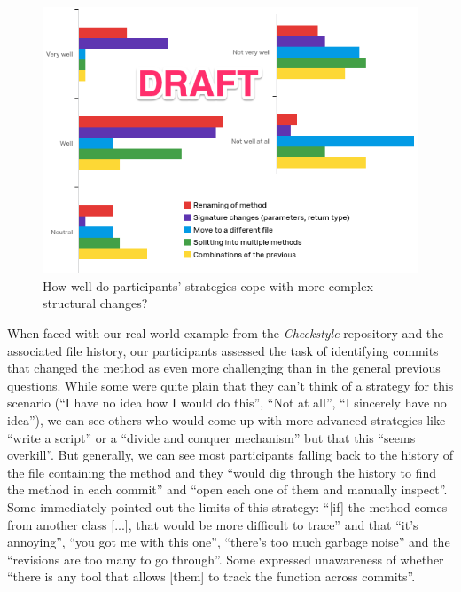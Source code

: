 \begin{figure}[t!]
  \includegraphics[width=0.98\columnwidth]{figures/strategy_complex_changes}
  \caption{How well do participants' strategies cope with more complex structural changes?}
  \label{fig:strategy_complex_changes}
\end{figure}


When faced with our real-world example from the \textit{Checkstyle} repository  and the associated file history, our participants assessed the task of identifying commits that changed the method as even more challenging than in the general previous questions. While some were quite plain that they can't think of a strategy for this scenario (``I have no idea how I would do this'', ``Not at all'', ``I sincerely have no idea''), we can see others who would come up with more advanced strategies like ``write a script'' or a ``divide and conquer mechanism'' but that this ``seems overkill''. But generally, we can see most participants falling back to the history of the file containing the method and they ``would dig through the history to find the method in each commit'' and ``open each one of them and manually inspect''. Some immediately pointed out the limits of this strategy: ``[if] the method comes from another class [...], that would be more difficult to trace'' and that ``it's annoying'', ``you got me with this one'', ``there's too much garbage noise'' and the ``revisions are too many to go through''. Some expressed unawareness of whether ``there is any tool that allows [them] to track the function across commits''.


